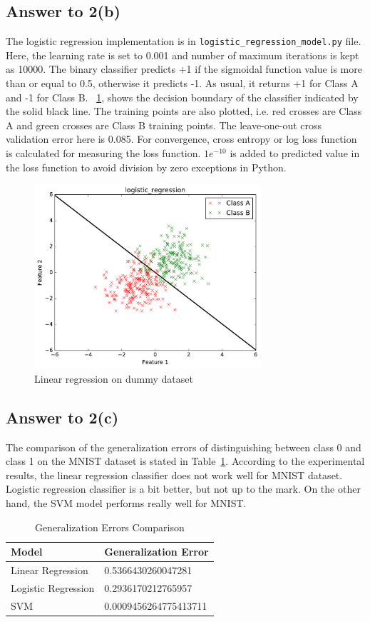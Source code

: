 \documentclass[runningheads]{llncs}
\begin{document}
\subsection{Answer to 2(b)}
The logistic regression implementation is in \texttt{logistic\_regression\_model.py} file. Here, the learning rate is
set to 0.001 and number of maximum iterations is kept as 10000. The binary classifier predicts +1 if the
sigmoidal function value is more than or equal to 0.5, otherwise it predicts -1.
As usual, it returns +1 for Class A and -1 for Class B. \figurename~\ref{fig:logistic_dummy}, shows the decision boundary
of the classifier indicated by the solid black line. The training points are also plotted, i.e. red crosses are
Class A and green crosses are Class B training points. The leave-one-out cross validation error here is 0.085.
For convergence, cross entropy or log loss function is calculated for measuring the loss function. $1e^{-10}$ is
added to predicted value in the loss function to avoid division by zero exceptions in Python.
\begin{figure}
\centering
\includegraphics[width=0.75\textwidth]{logistic_regression.pdf}
\caption{Linear regression on dummy dataset} \label{fig:logistic_dummy}
\end{figure}

\subsection{Answer to 2(c)}
The comparison of the generalization errors of distinguishing between class 0 and class 1 on the MNIST
dataset is stated in Table~\ref{tab:comp}. According to the experimental results, the linear regression
classifier does not work well for MNIST dataset. Logistic regression classifier is a bit better, but not
up to the mark. On the other hand, the SVM model performs really well for MNIST.
\begin{table}
\centering
\caption{Generalization Errors Comparison}\label{tab:comp}
\begin{tabular}{|l|l|}
\hline
Model &  Generalization Error\\
\hline
Linear Regression & 0.5366430260047281\\
Logistic Regression & 0.2936170212765957\\
SVM & 0.0009456264775413711\\
\hline
\end{tabular}
\end{table}
\end{document}
